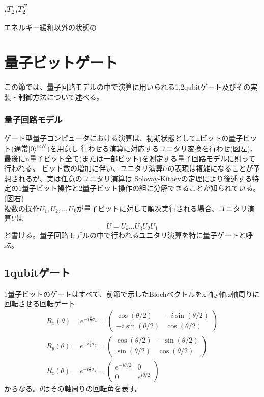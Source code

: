         \subsubsection{,$T_2$,$T_2^E$}
        エネルギー緩和以外の状態の
        

\section{量子ビットゲート}
    この節では、量子回路モデルの中で演算に用いられる1,2qubitゲート及びその実装・制御方法について述べる。
    \subsubsection{量子回路モデル}
    ゲート型量子コンピュータにおける演算は、初期状態としてnビットの量子ビット(通常$\ket{0}^{\otimes N}$)を用意し
    行わせる演算に対応するユニタリ変換を行わせ(図左)、最後にn量子ビット全て(または一部ビット)を測定する量子回路モデルに則って行われる。
    ビット数の増加に伴い、ユニタリ演算$U$の表現は複雑になることが予想されるが、実は任意のユニタリ演算は
    Solovay-Kitaevの定理により後述する特定の1量子ビット操作と2量子ビット操作の組に分解できることが知られている。
    (図右)\\
    複数の操作$U_1,U_2,..,U_k$が量子ビットに対して順次実行される場合、ユニタリ演算$U$は
    \begin{equation}
        U=U_k \dots U_3U_2U_1
    \end{equation}
    と書ける。量子回路モデルの中で行われるユニタリ演算を特に量子ゲートと呼ぶ。
    \subsection{1qubitゲート}
    1量子ビットのゲートはすべて、前節で示したBlochベクトルをx軸,y軸,z軸周りに回転させる回転ゲート
    \begin{equation}
        \begin{array}{l}
        R_{x}(\theta)=e^{-i \frac{\theta}{2} \sigma_{x}}=\left(\begin{array}{cc}
        \cos (\theta / 2) & -i \sin (\theta / 2) \\
        -i \sin (\theta / 2) & \cos (\theta / 2)
        \end{array}\right) \\
        R_{y}(\theta)=e^{-i \frac{\theta}{2} \sigma_{y}}=\left(\begin{array}{cc}
        \cos (\theta / 2) & -\sin (\theta / 2) \\
        \sin (\theta / 2) & \cos (\theta / 2)
        \end{array}\right) \\
        R_{z}(\theta)=e^{-i \frac{\theta}{2} \sigma_{z}}=\left(\begin{array}{cc}
        e^{-i \theta / 2} & 0 \\
        0 & e^{i \theta / 2}
        \end{array}\right)
        \end{array}
        \end{equation}
    からなる。$\theta$はその軸周りの回転角を表す。
